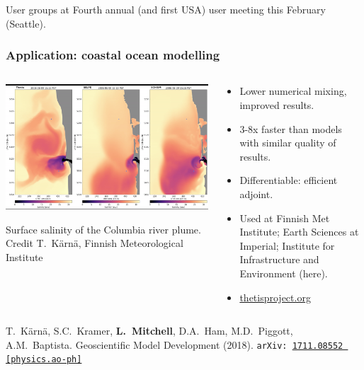 \documentclass[presentation,aspectratio=43, 10pt]{beamer}
\newcommand{\arxivlink}[2]{{\texttt{arXiv:\,\href{https://arxiv.org/abs/#1}{#1\,[#2]}}}}
\begin{document}
\begin{frame}
\begin{overlayarea}{\textwidth}{0.6\textheight}
\begin{onlyenv}
\begin{block}{User groups at}
      Fourth annual (and first USA) user meeting this February (Seattle).
    \end{block}
  \end{onlyenv}
\end{overlayarea}
\end{frame}

\begin{frame}
  \frametitle{Application: coastal ocean modelling}
  \begin{columns}
    \begin{column}{0.55\textwidth}
      \includegraphics[height=0.45\textheight]{thetis-snapshot}

      {\tiny Surface salinity of the Columbia river plume. Credit
        T.~K\"arn\"a, Finnish Meteorological Institute}
    \end{column}
    \hspace{-0.04\textwidth}
    \begin{column}{0.48\textwidth}
      \begin{itemize}
      \item Lower numerical mixing, improved results.
      \item 3-8x faster than models with similar quality of results.
      \item Differentiable: efficient adjoint.
      \item Used at Finnish Met Institute; Earth Sciences at
        Imperial; Institute for Infrastructure and Environment (here).
      \item \url{thetisproject.org}
       \end{itemize}
    \end{column}
  \end{columns}
  \begin{flushright}
    {\scriptsize T.~K\"arn\"a, S.C.~Kramer, \textbf{L.~Mitchell}, D.A.~Ham,
      M.D.~Piggott, A.M.~Baptista. Geoscientific Model Development
      (2018).
      \arxivlink{1711.08552}{physics.ao-ph}\nocite{Karna:2018}}
  \end{flushright}
\end{frame}
\end{document}
